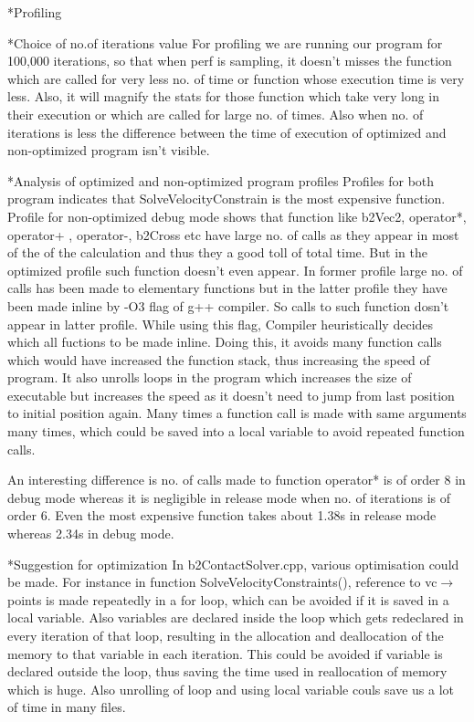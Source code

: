 \documentclass[11pt]{article}
\begin{document}
\begin{section}*{Profiling}
\begin{subsection}*{Choice of no.of iterations value}
For profiling we are running our program for 100,000 iterations, so that when perf is sampling, it doesn't misses the function which are called for very less no. of time or function whose execution time is very less. Also, it will magnify the stats for those function which take very long in their execution or which are called for large no. of times. Also when no. of iterations is less the difference between the time of execution of optimized and non-optimized program isn't visible.
\end{subsection}

\begin{subsection}*{Analysis of optimized and non-optimized program profiles}
 Profiles for both program indicates that SolveVelocityConstrain is the most expensive function. Profile for non-optimized debug mode shows that function like b2Vec2, operator*, operator+ , operator-, b2Cross etc have large no. of calls as they appear in most of the of the calculation and thus they a good toll of total time. But in the optimized profile such function doesn't even appear. In former profile large no. of calls has been made to elementary functions but in the latter profile they have been made inline by -O3 flag of g++ compiler. So calls to such function dosn't appear in latter profile. While using this flag, Compiler heuristically decides which all fuctions to be made inline. Doing this, it avoids many function calls which would have increased the function stack, thus increasing the speed of program. It also unrolls loops in the program which increases the size of executable but increases the speed as it doesn't need to jump from last position to initial position again. Many times a function call is made with same arguments many times, which could be saved into a local variable to avoid repeated function calls.

An interesting difference is no. of calls made to function operator* is of order 8 in debug mode whereas it is negligible in release mode when no. of iterations is of order 6. Even the most expensive function takes about 1.38s in release mode whereas 2.34s in debug mode.  
\end{subsection}

\begin{subsection}*{Suggestion for optimization}
 In b2ContactSolver.cpp, various optimisation could be made. For instance in function SolveVelocityConstraints(), reference to vc$\rightarrow$points is made repeatedly in a for loop, which can be avoided if it is saved in a local variable. Also variables are declared inside the loop which gets redeclared in every iteration of that loop, resulting in the allocation and deallocation of the memory to that variable in each iteration. This could be avoided if variable is declared outside the loop, thus saving the time used in reallocation of memory which is huge. Also unrolling of loop and using local variable couls save us a lot of time in many files.
\end{subsection}


\end{section}
\end{document}
